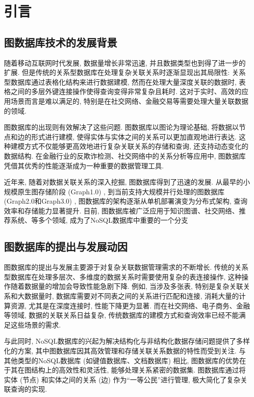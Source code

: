 \section{引言}

\subsection{图数据库技术的发展背景}

随着移动互联网时代发展, 数据量增长非常迅速, 并且数据类型也到得了进一步的扩展. 但是传统的关系型数据库在处理复杂关联关系时逐渐显现出其局限性: 关系型数据库通过表格化结构来进行数据建模, 然而在处理大量深度关联的数据时, 表格之间的多层外键连接操作使得查询变得非常复杂且耗时. 这对于实时、高效的应用场景而言是难以满足的, 特别是在社交网络、金融交易等需要处理大量关联数据的领域.

图数据库的出现则有效解决了这些问题. 图数据库以图论为理论基础, 将数据以节点和边的形式进行建模, 使得实体与实体之间的关系可以更加直观地进行表达. 这种建模方式不仅能够更高效地进行复杂关联关系的存储和查询, 还支持动态变化的数据结构. 在金融行业的反欺诈检测、社交网络中的关系分析等应用中, 图数据库凭借其优秀的性能逐渐成为一种重要的数据管理工具.

近年来, 随着对数据关联关系的深入挖掘, 图数据库得到了迅速的发展. 从最早的小规模原生图存储阶段 (Graph1.0) , 到当前支持大规模并行处理的图数据库 (Graph2.0和Graph3.0) , 图数据库的架构逐渐从单机部署演变为分布式架构, 查询效率和存储能力显著提升. 目前, 图数据库被广泛应用于知识图谱、社交网络、推荐系统、等多个领域, 成为了NoSQL数据库中重要的一个分支

\vspace{1cm}
\subsection{图数据库的提出与发展动因}

图数据库的提出与发展主要源于对复杂关联数据管理需求的不断增长. 传统的关系型数据库在处理多层次、多维度的数据关系时需要使用复杂的表连接操作, 这种操作随着数据量的增加会导致性能急剧下降. 例如, 当涉及多张表, 特别是复杂关联关系和大数据量时, 数据库需要对不同表之间的关系进行匹配和连接, 消耗大量的计算资源, 尤其是在深度连接时, 性能下降更为显著. 而在社交网络、电子商务、金融等领域, 数据的关联关系日益复杂, 传统数据库的建模方式和查询效率已经不能满足这些场景的需求.

与此同时, NoSQL数据库的兴起为解决结构化与非结构化数据存储问题提供了多样化的方案, 其中图数据库因其高效管理和存储关联关系数据的特性而受到关注. 与其他类型的NoSQL数据库 (如键值数据库、文档数据库) 相比, 图数据库的优势在于其在图结构上的高效性和灵活性, 能够处理关系紧密的数据集. 图数据库通过将实体 (节点) 和实体之间的关系 (边) 作为“一等公民”进行管理, 极大简化了复杂关联查询的实现.

